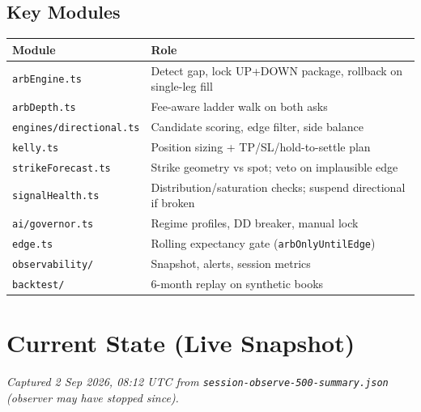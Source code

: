 \documentclass[11pt,a4paper]{article}
\begin{document}
\subsection{Key Modules}
\begin{longtable}{@{}p{3.2cm}p{9.8cm}@{}}
\toprule
\textbf{Module} & \textbf{Role} \\
\midrule
\endhead
\texttt{arbEngine.ts} & Detect gap, lock UP+DOWN package, rollback on single-leg fill \\
\texttt{arbDepth.ts} & Fee-aware ladder walk on both asks \\
\texttt{engines/directional.ts} & Candidate scoring, edge filter, side balance \\
\texttt{kelly.ts} & Position sizing + TP/SL/hold-to-settle plan \\
\texttt{strikeForecast.ts} & Strike geometry vs spot; veto on implausible edge \\
\texttt{signalHealth.ts} & Distribution/saturation checks; suspend directional if broken \\
\texttt{ai/governor.ts} & Regime profiles, DD breaker, manual lock \\
\texttt{edge.ts} & Rolling expectancy gate (\texttt{arbOnlyUntilEdge}) \\
\texttt{observability/} & Snapshot, alerts, session metrics \\
\texttt{backtest/} & 6-month replay on synthetic books \\
\bottomrule
\end{longtable}

\section{Current State (Live Snapshot)}

\noindent\textit{Captured 2 Sep 2026, 08:12 UTC from \texttt{session-observe-500-summary.json} (observer may have stopped since).}
\end{document}
